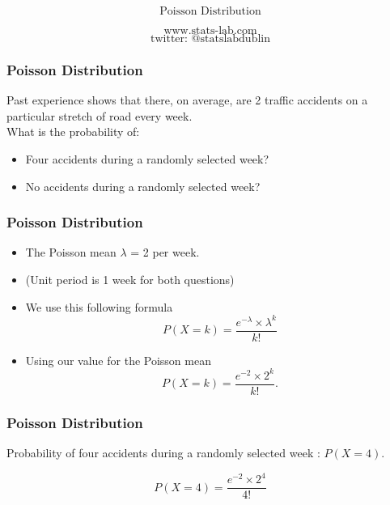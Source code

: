 \documentclass{beamer}
\begin{document}
\begin{frame}

{
\Huge
\[\mbox{Poisson Distribution} \]
}
{
\Large

\[\mbox{www.stats-lab.com} \]
\[ \mbox{twitter: @statslabdublin} \] 

}
\end{frame}


\begin{frame}
\frametitle{Poisson Distribution}
\Large
\vspace{-1.5cm}
Past experience shows that there, on average, are 2 traffic accidents on a particular stretch of road every week. 
\\
\bigskip
What is the probability of: 
\begin{itemize}

\item Four accidents during a randomly selected week?  

\item No accidents during a randomly selected week?  
\end{itemize}

\end{frame}


\begin{frame}
\frametitle{Poisson Distribution}
\Large
\vspace{-1.5cm}
\Large
\begin{itemize}

\item The Poisson mean $\lambda$ = 2  per week.
\item (Unit period is 1 week for both questions)
\item We use this following formula
\[ P(X=k) =  \frac{e^{-\lambda} \times \lambda ^k}{k!}  \]
\item Using our value for the Poisson mean
\[ P(X=k) =  \frac{e^{-2} \times 2^k}{k!} . \]

\end{itemize}

\end{frame}
\begin{frame}
\frametitle{Poisson Distribution}
\Large
\vspace{-2.5cm}
\Large
Probability of four accidents during a randomly selected week : $ P(X = 4)$.

\[ P(X=4) =  \frac{e^{-2} \times 2^4}{4!}  \]

\end{frame}
\end{document}
